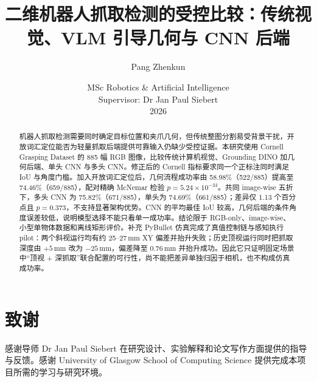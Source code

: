 \documentclass{l4proj}
\begin{document}
\renewcommand{\abstractname}{摘要}
\renewcommand{\contentsname}{目录}
\renewcommand{\figurename}{图}
\renewcommand{\tablename}{表}
\renewcommand{\bibname}{参考文献}
\renewcommand{\appendixname}{附录}
\renewcommand{\appendixtocname}{附录}

\title{二维机器人抓取检测的受控比较：传统视觉、VLM 引导几何与 CNN 后端}
\author{Pang Zhenkun}
\date{MSc Robotics \& Artificial Intelligence\\Supervisor: Dr Jan Paul Siebert\\2026}

\maketitle

\begin{abstract}
机器人抓取检测需要同时确定目标位置和夹爪几何，但传统整图分割易受背景干扰，开放词汇定位能否为轻量抓取后端提供可靠输入仍缺少受控证据。本研究使用 Cornell Grasping Dataset 的 885 幅 RGB 图像，比较传统计算机视觉、Grounding DINO 加几何后端、单头 CNN 与多头 CNN。修正后的 Cornell 指标要求同一个正标注同时满足 IoU 与角度门槛。加入开放词汇定位后，几何流程成功率由 58.98\%（522/885）提高至 74.46\%（659/885），配对精确 McNemar 检验 $p=5.24\times10^{-33}$。共同 image-wise 五折下，多头 CNN 为 75.82\%（671/885），单头为 74.69\%（661/885）；差异仅 1.13 个百分点且 $p=0.373$，不支持显著架构优势。CNN 的平均最佳 IoU 较高，几何后端的条件角度误差较低，说明模型选择不能只看单一成功率。结论限于 RGB-only、image-wise、小型单物体数据和离线矩形评价。补充 PyBullet 仿真完成了真值控制链与感知执行 pilot：两个斜视运行均有约 25--27\,mm XY 偏差并抬升失败；历史顶视运行同时把抓取深度由 $+5$\,mm 改为 $-25$\,mm，偏差降至 0.76\,mm 并抬升成功。因此它只证明固定场景中“顶视 + 深抓取”联合配置的可行性，尚不能把差异单独归因于相机，也不构成仿真成功率。
\end{abstract}

\chapter*{致谢}
感谢导师 Dr Jan Paul Siebert 在研究设计、实验解释和论文写作方面提供的指导与反馈。感谢 University of Glasgow School of Computing Science 提供完成本项目所需的学习与研究环境。
\end{document}
